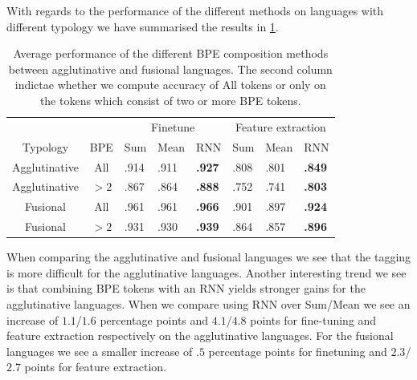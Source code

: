 \documentclass[11pt]{article}
\begin{document}
    
        With regards to the performance of the different methods on
     languages with different typology we have summarised the results
     in \cref{tab:typology_performace}. 

    \begin{table}
        \centering  
        \begin{tabular} {c|cllllll}
            & & \multicolumn{3}{c}{Finetune} & \multicolumn{3}{c}{Feature extraction} \\
            Typology & BPE & Sum & Mean & RNN & Sum & Mean & RNN \\
            \hline
            Agglutinative & All & .914 & .911 & \textbf{.927} & .808 & .801 & \textbf{.849} \\   
            Agglutinative & $>2$ & .867 & .864 & \textbf{.888} & .752 & .741 & \textbf{.803} \\
            Fusional & All & .961 & .961  & \textbf{.966} & .901 & .897 & \textbf{.924} \\
            Fusional & $>2$ & .931 & .930  & \textbf{.939} & .864 & .857 & \textbf{.896} \\
        \end{tabular}
     \caption{Average performance of the different BPE
     composition methods between agglutinative and fusional
     languages. The second column indictae whether we compute accuracy
     of All tokens or only on the tokens which consist of two or more
     BPE tokens. }
     \label{tab:typology_performace}
    \end{table}

         When comparing the agglutinative and fusional languages we
     see that the tagging is more difficult for the agglutinative
     languages. Another interesting trend we see is that combining BPE
     tokens with an RNN yields stronger gains for the agglutinative
     languages. When we compare using RNN over Sum/Mean we see an
     increase of $1.1$/$1.6$ percentage points and $4.1$/$4.8$ points
     for fine-tuning and feature extraction respectively on the
     agglutinative languages. For the fusional languages we see a
     smaller increase of $.5$ percentage points for finetuning and
     $2.3$/$2.7$ points for feature extraction.
\end{document}
